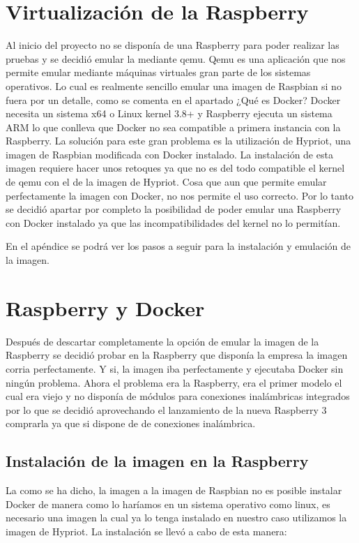 \section{Virtualización de la Raspberry}

Al inicio del proyecto no se disponía de una Raspberry para poder realizar las pruebas y se decidió emular la mediante qemu. 
Qemu es una aplicación que nos permite emular mediante máquinas virtuales gran parte de los sistemas operativos. 
Lo cual es realmente sencillo emular una imagen de Raspbian si no fuera por un detalle, como se comenta en el apartado ¿Qué es Docker? Docker necesita un sistema x64 o Linux kernel 3.8+ y Raspberry ejecuta un sistema ARM lo que conlleva que Docker no sea compatible a primera instancia con la Raspberry. 
La solución para este gran problema es la utilización de Hypriot, una imagen de Raspbian modificada con Docker instalado. 
La instalación de esta imagen  requiere hacer unos retoques ya que no es del todo compatible el kernel de qemu con el de la imagen de Hypriot. Cosa que aun que permite emular perfectamente la imagen con Docker, no nos permite el uso correcto. Por lo tanto se decidió apartar por completo la posibilidad de poder emular una Raspberry con Docker instalado ya que las incompatibilidades del kernel no lo permitían.

En el apéndice se podrá ver los pasos a seguir para la instalación y emulación de la imagen. 

\section{Raspberry y Docker}

Después de descartar completamente la opción de emular la imagen de la Raspberry se decidió probar en la Raspberry que disponía la empresa la imagen corria perfectamente. Y si, la imagen iba perfectamente y ejecutaba Docker sin ningún problema. Ahora el problema era la Raspberry, era el primer modelo el cual era viejo y no disponía de módulos para conexiones inalámbricas integrados por lo que se decidió aprovechando el lanzamiento de la nueva Raspberry 3 comprarla ya que si dispone de de conexiones inalámbrica. 

\subsection{Instalación de la imagen en la Raspberry}

La como se ha dicho, la imagen a la imagen de Raspbian no es posible instalar Docker de manera como lo haríamos en un sistema operativo como linux, es necesario una imagen la cual ya lo tenga instalado en nuestro caso utilizamos la imagen de Hypriot. La instalación se llevó a cabo de esta manera:


